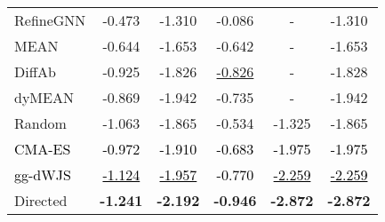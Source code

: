 \begin{minipage}[h]{\textwidth}
\begin{minipage}{0.46\textwidth}
{\begin{tabular}{l|cccc|c}
RefineGNN & -0.473 & -1.310 & -0.086 & - & -1.310 \\
MEAN & -0.644 & -1.653 & -0.642 & -& -1.653 \\
DiffAb & -0.925 & -1.826 & \underline{-0.826} & -& -1.828 \\
dyMEAN & -0.869 & -1.942 & -0.735 & -& -1.942 \\ \midrule

Random & -1.063 & -1.865 & -0.534 & -1.325 & -1.865 \\
\textcolor{black}{CMA-ES} & \textcolor{black}{-0.972} & \textcolor{black}{-1.910} & \textcolor{black}{-0.683} & \textcolor{black}{-1.975} & \textcolor{black}{-1.975} \\
\textcolor{black}{gg-dWJS} & \textcolor{black}{\underline{-1.124}} & \textcolor{black}{\underline{-1.957}} & \textcolor{black}{-0.770} & \textcolor{black}{\underline{-2.259}} & \textcolor{black}{\underline{-2.259}} \\
Directed & \textbf{-1.241} & \textbf{-2.192} & \textbf{-0.946} & \textbf{-2.872} & \textbf{-2.872} \\ \bottomrule

        \end{tabular}}
    \end{minipage}
\end{minipage}